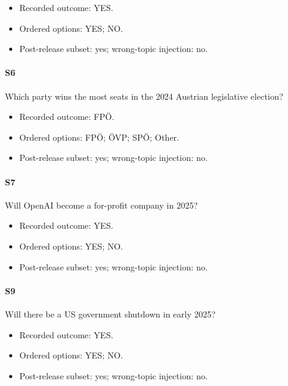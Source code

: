 \begin{itemize}

\item Recorded outcome: YES.

\item Ordered options: YES; NO.

\item Post-release subset: yes; wrong-topic injection: no.

\end{itemize}

\paragraph*{S6} Which party wins the most seats in the 2024 Austrian legislative election?

\begin{itemize}

\item Recorded outcome: FPÖ.

\item Ordered options: FPÖ; ÖVP; SPÖ; Other.

\item Post-release subset: yes; wrong-topic injection: no.

\end{itemize}

\paragraph*{S7} Will OpenAI become a for-profit company in 2025?

\begin{itemize}

\item Recorded outcome: YES.

\item Ordered options: YES; NO.

\item Post-release subset: yes; wrong-topic injection: no.

\end{itemize}

\paragraph*{S9} Will there be a US government shutdown in early 2025?

\begin{itemize}

\item Recorded outcome: YES.

\item Ordered options: YES; NO.

\item Post-release subset: yes; wrong-topic injection: no.

\end{itemize}


